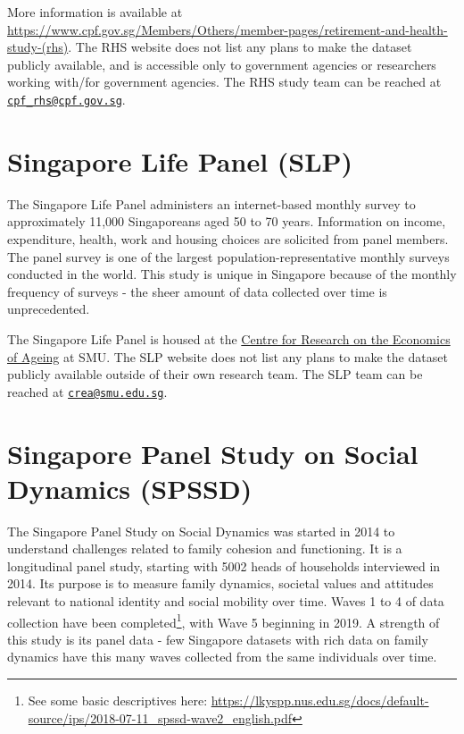 \documentclass[
  openany]{book}
\begin{document}
More information is available at \url{https://www.cpf.gov.sg/Members/Others/member-pages/retirement-and-health-study-(rhs)}. The RHS website does not list any plans to make the dataset publicly available, and is accessible only to government agencies or researchers working with/for government agencies. The RHS study team can be reached at \href{mailto:cpf_rhs@cpf.gov.sg}{\nolinkurl{cpf\_rhs@cpf.gov.sg}}.

\hypertarget{slp}{%
\section{Singapore Life Panel (SLP)}\label{slp}}

The Singapore Life Panel administers an internet-based monthly survey to approximately 11,000 Singaporeans aged 50 to 70 years. Information on income, expenditure, health, work and housing choices are solicited from panel members. The panel survey is one of the largest population-representative monthly surveys conducted in the world. This study is unique in Singapore because of the monthly frequency of surveys - the sheer amount of data collected over time is unprecedented.

The Singapore Life Panel is housed at the \href{https://crea.smu.edu.sg/singapore-monthly-panel}{Centre for Research on the Economics of Ageing} at SMU. The SLP website does not list any plans to make the dataset publicly available outside of their own research team. The SLP team can be reached at \href{mailto:crea@smu.edu.sg}{\nolinkurl{crea@smu.edu.sg}}.

\hypertarget{spssd}{%
\section{Singapore Panel Study on Social Dynamics (SPSSD)}\label{spssd}}

The Singapore Panel Study on Social Dynamics was started in 2014 to understand challenges related to family cohesion and functioning. It is a longitudinal panel study, starting with 5002 heads of households interviewed in 2014. Its purpose is to measure family dynamics, societal values and attitudes relevant to national identity and social mobility over time. Waves 1 to 4 of data collection have been completed\footnote{See some basic descriptives here: \url{https://lkyspp.nus.edu.sg/docs/default-source/ips/2018-07-11_spssd-wave2_english.pdf}}, with Wave 5 beginning in 2019. A strength of this study is its panel data - few Singapore datasets with rich data on family dynamics have this many waves collected from the same individuals over time.
\end{document}
